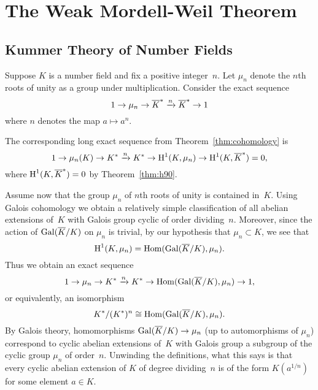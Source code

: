 \chapter{The Weak Mordell-Weil Theorem}\label{ch:weakmw}

\section{Kummer Theory of Number Fields}\label{sec:kummernf}

Suppose $K$ is a number field and fix a positive integer~$n$.
Let $\mu_n$ denote the $n$th roots of unity as a group
under multiplication. Consider the exact sequence
$$
	1 \to \mu_n \to \overline{K}^* \xrightarrow{n} \overline{K}^* \to 1
$$
where $n$ denotes the map $a\mapsto a^n$.

The corresponding long exact sequence from Theorem~\ref{thm:cohomology}
is
$$
	1 \to \mu_n(K) \to K^* \xrightarrow{n} K^* \to \operatorname{H}^1(K,\mu_n) \to \operatorname{H}^1(K,\overline{K}^*) =0,
$$
where $\operatorname{H}^1(K,\overline{K}^*)=0$ by Theorem~\ref{thm:h90}.

Assume now that the group $\mu_n$ of $n$th roots of unity is
contained in~$K$. Using Galois cohomology we obtain a relatively
simple classification of all abelian extensions of~$K$ with
Galois group cyclic of order dividing~$n$.  Moreover, since the
action of $\operatorname{Gal}(\overline{K}/K)$ on $\mu_n$ is trivial, by our hypothesis
that $\mu_n\subset K$, we see that
$$
	\operatorname{H}^1(K,\mu_n) = \operatorname{Hom}(\operatorname{Gal}(\overline{K}/K),\mu_n).
$$
Thus we obtain an exact sequence
$$
	1 \to \mu_n \to K^* \xrightarrow{n} K^* \to \operatorname{Hom}(\operatorname{Gal}(\overline{K}/K),\mu_n) \to 1,
$$
or equivalently, an isomorphism
$$
	K^*/(K^*)^n \cong \operatorname{Hom}(\operatorname{Gal}(\overline{K}/K),\mu_n).
$$
By Galois theory, homomorphisms $\operatorname{Gal}(\overline{K}/K)\to \mu_n$ (up to
automorphisms of $\mu_n$) correspond to cyclic abelian extensions
of~$K$ with Galois group a subgroup of the cyclic group $\mu_n$ of
order~$n$.  Unwinding the definitions, what this says is that every
cyclic abelian extension of $K$ of degree dividing~$n$ is of the form
$K(a^{1/n})$ for some element $a\in K$.

